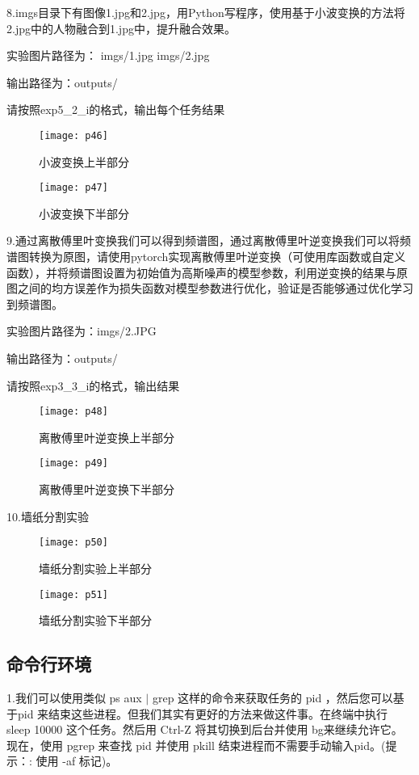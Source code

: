 \documentclass[a4paper ,12pt]{article}
\begin{document}
	8.imgs目录下有图像1.jpg和2.jpg，用Python写程序，使用基于小波变换的方法将2.jpg中的人物融合到1.jpg中，提升融合效果。
	
	实验图片路径为：
	imgs/1.jpg
	imgs/2.jpg
	
	输出路径为：outputs/
	
	请按照exp5\_2\_i的格式，输出每个任务结果
	
	 \begin{figure}[h]
		\centering
		\texttt{[image: p46]}
		\caption{小波变换上半部分}
	\end{figure}
	
	 \begin{figure}[h]
		\centering
		\texttt{[image: p47]}
		\caption{小波变换下半部分}
	\end{figure}
	
	9.通过离散傅里叶变换我们可以得到频谱图，通过离散傅里叶逆变换我们可以将频谱图转换为原图，请使用pytorch实现离散傅里叶逆变换（可使用库函数或自定义函数），并将频谱图设置为初始值为高斯噪声的模型参数，利用逆变换的结果与原图之间的均方误差作为损失函数对模型参数进行优化，验证是否能够通过优化学习到频谱图。
	
	实验图片路径为：imgs/2.JPG
	
	输出路径为：outputs/
	
	请按照exp3\_3\_i的格式，输出结果
	
	 \begin{figure}[h]
		\centering
		\texttt{[image: p48]}
		\caption{离散傅里叶逆变换上半部分}
	\end{figure}
	
	 \begin{figure}[h]
		\centering
		\texttt{[image: p49]}
		\caption{离散傅里叶逆变换下半部分}
	\end{figure}
	
	10.墙纸分割实验
	 \begin{figure}[h]
		\centering
		\texttt{[image: p50]}
		\caption{墙纸分割实验上半部分}
	\end{figure}
	
	 \begin{figure}[h]
		\centering
		\texttt{[image: p51]}
		\caption{墙纸分割实验下半部分}
	\end{figure}
	
	\subsection{命令行环境}
	1.我们可以使用类似 ps aux $|$ grep 这样的命令来获取任务的 pid ，然后您可以基于pid 来结束这些进程。但我们其实有更好的方法来做这件事。在终端中执行 sleep 10000 这个任务。然后用 Ctrl-Z 将其切换到后台并使用 bg来继续允许它。现在，使用 pgrep 来查找 pid 并使用 pkill 结束进程而不需要手动输入pid。(提示：: 使用 -af 标记)。
	
\end{document}
